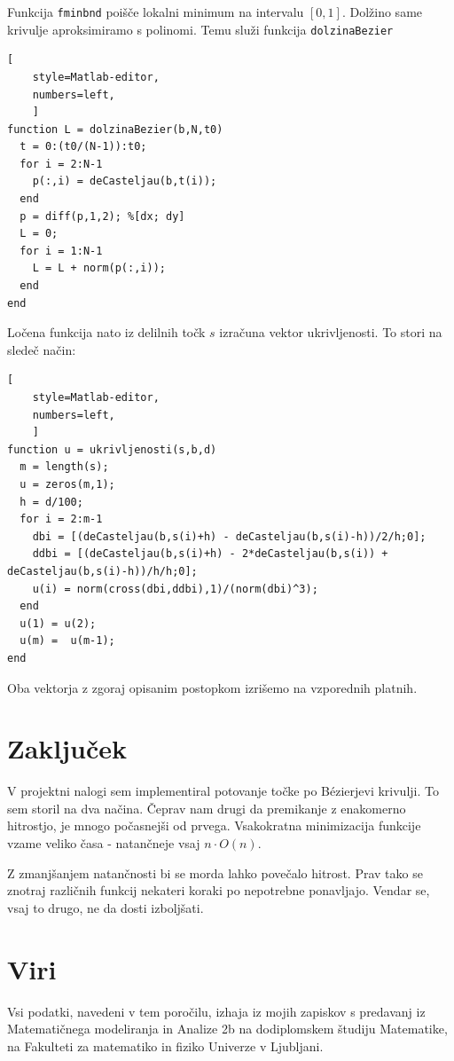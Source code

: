 \documentclass[a4paper,12pt]{article}
\begin{document}
	Funkcija \lstinline[style=Matlab-editor]!fminbnd! poišče lokalni minimum na intervalu $[0,1]$. Dolžino same krivulje aproksimiramo s polinomi. Temu služi funkcija \lstinline[style=Matlab-editor]!dolzinaBezier!
	
	\begin{lstlisting}[
	style=Matlab-editor,
	numbers=left,
	]
function L = dolzinaBezier(b,N,t0)
  t = 0:(t0/(N-1)):t0;
  for i = 2:N-1
    p(:,i) = deCasteljau(b,t(i));
  end
  p = diff(p,1,2); %[dx; dy]
  L = 0;
  for i = 1:N-1
    L = L + norm(p(:,i));
  end
end
	\end{lstlisting}
	
	Ločena funkcija nato iz delilnih točk $s$ izračuna vektor ukrivljenosti. To stori na sledeč način:
	
	\begin{lstlisting}[
	style=Matlab-editor,
	numbers=left,
	]
function u = ukrivljenosti(s,b,d)
  m = length(s);
  u = zeros(m,1);
  h = d/100;
  for i = 2:m-1
    dbi = [(deCasteljau(b,s(i)+h) - deCasteljau(b,s(i)-h))/2/h;0];
    ddbi = [(deCasteljau(b,s(i)+h) - 2*deCasteljau(b,s(i)) + deCasteljau(b,s(i)-h))/h/h;0];
    u(i) = norm(cross(dbi,ddbi),1)/(norm(dbi)^3);
  end
  u(1) = u(2);
  u(m) =  u(m-1);
end
	\end{lstlisting}
	
	Oba vektorja z zgoraj opisanim postopkom izrišemo na vzporednih platnih.
	
	\section{Zaključek}
	
	V projektni nalogi sem implementiral potovanje točke po B\'ezierjevi krivulji. To sem storil na dva načina. Čeprav nam drugi da premikanje z enakomerno hitrostjo, je mnogo počasnejši od prvega. Vsakokratna minimizacija funkcije vzame veliko časa - natančneje vsaj $n \cdot O(n)$. 
	
	Z zmanjšanjem natančnosti bi se morda lahko povečalo hitrost. Prav tako se znotraj različnih funkcij nekateri koraki po nepotrebne ponavljajo. Vendar se, vsaj to drugo, ne da dosti izboljšati.
	
	\section{Viri}
	
	Vsi podatki, navedeni v tem poročilu, izhaja iz mojih zapiskov s predavanj iz Matematičnega modeliranja in Analize 2b na dodiplomskem študiju Matematike, na Fakulteti za matematiko in fiziko Univerze v Ljubljani.
	
\end{document}
